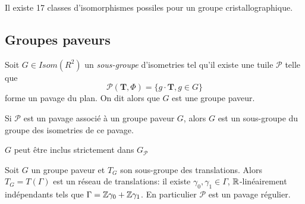 \begin{theorem}
	Il existe 17 classes d'isomorphismes possiles pour un groupe
	cristallographique.
\end{theorem}

\subsection{Groupes paveurs}

\begin{definition}
	Soit $G \in Isom(R^2)$ un \emph{sous-groupe} d'isometries tel qu'il existe une tuile
	$\mathcal{P}$ telle que
	\begin{equation*}
		\mathcal{P}(\mathbf{T}, \Phi) = \{g \cdot \mathbf{T}, g \in G\}
	\end{equation*}
	forme un pavage du plan. On dit alors que $G$ est une groupe paveur.
\end{definition}

\begin{remark}
	Si $\mathcal{P}$ est un pavage associé à un groupe paveur $G$, alors $G$ est
	un sous-groupe du groupe des isometries de ce pavage.
\end{remark}

\begin{remark}
	$G$ peut être inclus strictement dans $G_\mathcal{P}$
\end{remark}

\begin{theorem}
	Soit $G$ un groupe paveur et $T_G$ son sous-groupe des translations.
	Alors $T_G = T(\Gamma)$ est un réseau de translations: il existe
	$\gamma_0, \gamma_1 \in \Gamma$, $\mathbb{R}$-linéairement indépendants tels que
	$\Gamma = \mathbb{Z}\gamma_0 + \mathbb{Z}\gamma_1$. En particulier $\mathcal{P}$ est un pavage
	régulier.
\end{theorem}

